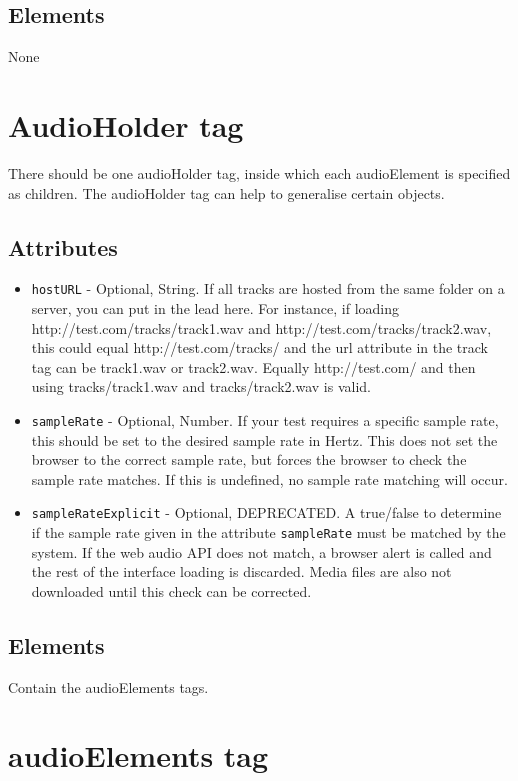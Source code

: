 \documentclass{article}
\begin{document}
\subsection{Elements}
None

\section{AudioHolder tag}

There should be one audioHolder tag, inside which each audioElement is specified as children. The audioHolder tag can help to generalise certain objects.

\subsection{Attributes}
\begin{itemize}
\item \texttt{hostURL} - Optional, String. If all tracks are hosted from the same folder on a server, you can put in the lead here. For instance, if loading http://test.com/tracks/track1.wav and http://test.com/tracks/track2.wav, this could equal http://test.com/tracks/ and the url attribute in the track tag can be track1.wav or track2.wav. Equally http://test.com/ and then using tracks/track1.wav and tracks/track2.wav is valid.
\item \texttt{sampleRate} - Optional, Number. If your test requires a specific sample rate, this should be set to the desired sample rate in Hertz. This does not set the browser to the correct sample rate, but forces the browser to check the sample rate matches. If this is undefined, no sample rate matching will occur.
\item \texttt{sampleRateExplicit} - Optional, DEPRECATED. A true/false to determine if the sample rate given in the attribute \texttt{sampleRate} must be matched by the system. If the web audio API does not match, a browser alert is called and the rest of the interface loading is discarded. Media files are also not downloaded until this check can be corrected.
\end{itemize}

\subsection{Elements}
Contain the audioElements tags.

\section{audioElements tag}
\end{document}
